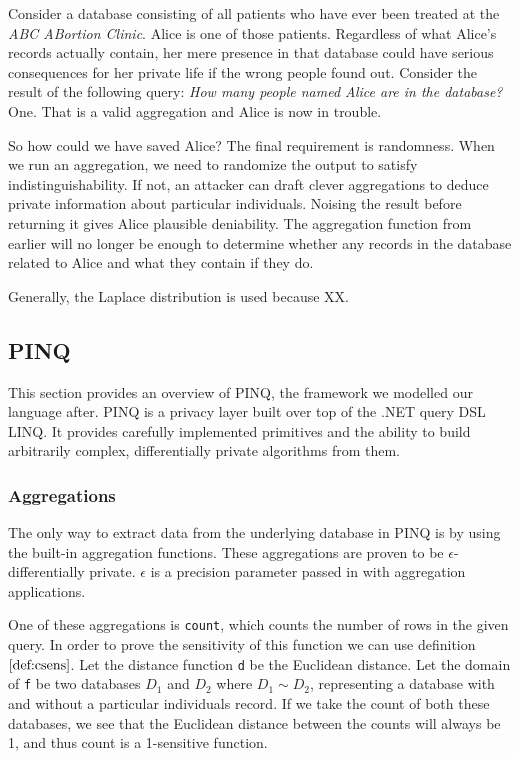 \documentclass[12pt]{article}
\begin{document}
Consider a database consisting of all patients who have ever been treated at the \textit{ABC ABortion Clinic}.
Alice is one of those patients.
Regardless of what Alice's records actually contain, her mere presence in that database could have serious consequences for her private life if the wrong people found out.
Consider the result of the following query: \textit{How many people named Alice are in the database?}
One.
That is a valid aggregation and Alice is now in trouble.

So how could we have saved Alice?
The final requirement is randomness.
When we run an aggregation, we need to randomize the output to satisfy indistinguishability.
If not, an attacker can draft clever aggregations to deduce private information about particular individuals.
Noising the result before returning it gives Alice plausible deniability.
The aggregation function from earlier will no longer be enough to determine whether any records in the database related to Alice and what they contain if they do.

Generally, the Laplace distribution is used because XX.

\subsection{PINQ}\label{sec:pinq}

This section provides an overview of PINQ, the framework we modelled our language after.
PINQ is a privacy layer built over top of the .NET query DSL LINQ.
It provides carefully implemented primitives and the ability to build arbitrarily complex, differentially private algorithms from them.

\subsubsection{Aggregations}

The only way to extract data from the underlying database in PINQ is by using the built-in aggregation functions.
These aggregations are proven to be $\epsilon$-differentially private.
$\epsilon$ is a precision parameter passed in with aggregation applications.

One of these aggregations is \texttt{count}, which counts the number of rows in the given query.
In order to prove the sensitivity of this function we can use definition $\ref{def:csens}$.
Let the distance function \texttt{d} be the Euclidean distance.
Let the domain of \texttt{f} be two databases $D_1$ and $D_2$ where $D_1 \sim D_2$, representing a database with and without a particular individuals record.
If we take the count of both these databases, we see that the Euclidean distance between the counts will always be 1, and thus count is a 1-sensitive function.
\end{document}

